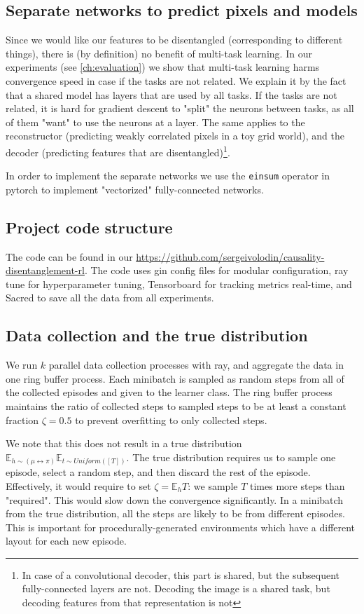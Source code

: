 \documentclass[a4paper,11pt,oneside]{report}
\begin{document}
\subsection{Separate networks to predict pixels and models}
Since we would like our features to be disentangled (corresponding to different things), there is (by definition) no benefit of multi-task learning. In our experiments (see \autoref{ch:evaluation}) we show that multi-task learning harms convergence speed in case if the tasks are not related. We explain it by the fact that a shared model has layers that are used by all tasks. If the tasks are not related, it is hard for gradient descent to "split" the neurons between tasks, as all of them "want" to use the neurons at a layer. The same applies to the reconstructor (predicting weakly correlated pixels in a toy grid world), and the decoder (predicting features that are disentangled)\footnote{In case of a convolutional decoder, this part is shared, but the subsequent fully-connected layers are not. Decoding the image is a shared task, but decoding features from that representation is not}.

In order to implement the separate networks we use the {\tt einsum} operator in pytorch to implement "vectorized" fully-connected networks.

\subsection{Project code structure}
The code can be found in our \href{Github repository}{https://github.com/sergeivolodin/causality-disentanglement-rl}. The code uses gin config files for modular configuration, ray tune for hyperparameter tuning, Tensorboard for tracking metrics real-time, and Sacred to save all the data from all experiments.

\subsection{Data collection and the true distribution}
We run $k$ parallel data collection processes with ray, and aggregate the data in one ring buffer process. Each minibatch is sampled as random steps from all of the collected episodes and given to the learner class. The ring buffer process maintains the ratio of collected steps to sampled steps to be at least a constant fraction $\zeta=0.5$ to prevent overfitting to only collected steps.

We note that this does not result in a true distribution $\mathbb E_{h\sim (\mu\leftrightarrow\pi)}\mathbb E_{t\sim Uniform([T])}$. The true distribution requires us to sample one episode, select a random step, and then discard the rest of the episode. Effectively, it would require to set $\zeta=\mathbb E_{h}T$: we sample $T$ times more steps than "required". This would slow down the convergence significantly. In a minibatch from the true distribution, all the steps are likely to be from different episodes. This is important for procedurally-generated environments which have a different layout for each new episode.
\end{document}
